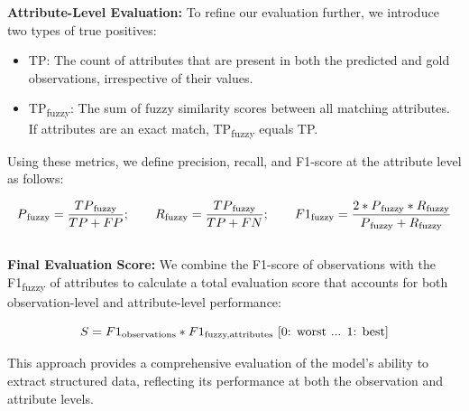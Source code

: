 \documentclass{article}
\begin{document}
\textbf{Attribute-Level Evaluation:} To refine our evaluation further, we introduce two types of true positives:

\begin{itemize}
    \item TP: The count of attributes that are present in both the predicted and gold observations, irrespective of their values.
    \item TP\textsubscript{fuzzy}: The sum of fuzzy similarity scores between all matching attributes. If attributes are an exact match, TP\textsubscript{fuzzy} equals TP.
\end{itemize}


Using these metrics, we define precision, recall, and F1-score at the attribute level as follows:

\begin{equation}
    P\textsubscript{fuzzy} = \frac{TP\textsubscript{fuzzy}}{TP+FP};\quad \quad 
    R\textsubscript{fuzzy} = \frac{TP\textsubscript{fuzzy}}{TP+FN};\quad \quad
    F1\textsubscript{fuzzy} = \frac{2*P\textsubscript{fuzzy}*R\textsubscript{fuzzy}}{P\textsubscript{fuzzy}+R\textsubscript{fuzzy}}
    \label{eq:pre_rec_f1_fuzzy} 
\end{equation}\\

\textbf{Final Evaluation Score:} We combine the F1-score of observations with the F1\textsubscript{fuzzy} of attributes to calculate a total evaluation score that accounts for both observation-level and attribute-level performance:

\begin{equation}
    S = F1\textsubscript{observations}*F1\textsubscript{fuzzy,attributes} \textrm{ [0: worst ... 1: best]} 
    \label{eq: total_score} 
\end{equation}

This approach provides a comprehensive evaluation of the model’s ability to extract structured data, reflecting its performance at both the observation and attribute levels.
\end{document}
